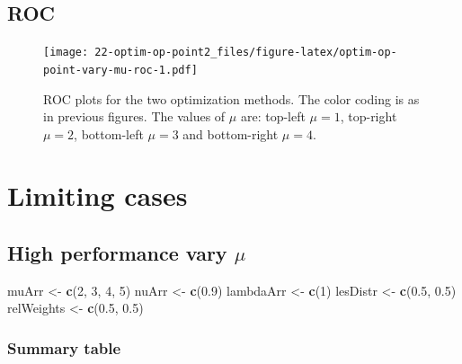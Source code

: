 \documentclass[
]{book}
\newenvironment{Shaded}{\begin{snugshade}}{\end{snugshade}}
\newcommand{\DecValTok}[1]{\textcolor[rgb]{0.00,0.00,0.81}{#1}}
\newcommand{\FloatTok}[1]{\textcolor[rgb]{0.00,0.00,0.81}{#1}}
\newcommand{\KeywordTok}[1]{\textcolor[rgb]{0.13,0.29,0.53}{\textbf{#1}}}
\newcommand{\NormalTok}[1]{#1}
\newcommand{\StringTok}[1]{\textcolor[rgb]{0.31,0.60,0.02}{#1}}
\begin{document}
\hypertarget{roc-4}{%
\subsection{ROC}\label{roc-4}}

\begin{figure}
\centering
\texttt{[image: 22-optim-op-point2\_files/figure-latex/optim-op-point-vary-mu-roc-1.pdf]}
\caption{\label{fig:optim-op-point-vary-mu-roc}ROC plots for the two optimization methods. The color coding is as in previous figures. The values of \(\mu\) are: top-left \(\mu = 1\), top-right \(\mu = 2\), bottom-left \(\mu = 3\) and bottom-right \(\mu = 4\).}
\end{figure}

\hypertarget{optim-op-point-limiting-situations}{%
\section{Limiting cases}\label{optim-op-point-limiting-situations}}

\hypertarget{optim-op-point-high-performance-vary-mu}{%
\subsection{\texorpdfstring{High performance vary \(\mu\)}{High performance vary \textbackslash mu}}\label{optim-op-point-high-performance-vary-mu}}

\begin{Shaded}
\begin{Highlighting}[]
\NormalTok{muArr <-}\StringTok{ }\KeywordTok{c}\NormalTok{(}\DecValTok{2}\NormalTok{, }\DecValTok{3}\NormalTok{, }\DecValTok{4}\NormalTok{, }\DecValTok{5}\NormalTok{)}
\NormalTok{nuArr <-}\StringTok{ }\KeywordTok{c}\NormalTok{(}\FloatTok{0.9}\NormalTok{)}
\NormalTok{lambdaArr <-}\StringTok{ }\KeywordTok{c}\NormalTok{(}\DecValTok{1}\NormalTok{)}
\NormalTok{lesDistr <-}\StringTok{ }\KeywordTok{c}\NormalTok{(}\FloatTok{0.5}\NormalTok{, }\FloatTok{0.5}\NormalTok{)}
\NormalTok{relWeights <-}\StringTok{ }\KeywordTok{c}\NormalTok{(}\FloatTok{0.5}\NormalTok{, }\FloatTok{0.5}\NormalTok{)}
\end{Highlighting}
\end{Shaded}

\hypertarget{summary-table-4}{%
\subsubsection{Summary table}\label{summary-table-4}}
\end{document}
